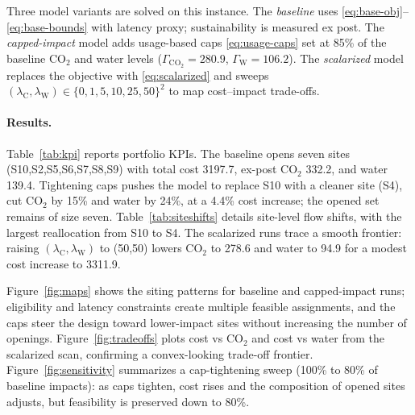 \documentclass[pdflatex,sn-mathphys-num]{sn-jnl}
\theoremstyle{thmstyleone}
\theoremstyle{thmstyletwo}
\theoremstyle{thmstylethree}
\begin{document}
\begin{table}[t]
  \centering
  \caption{Toy instance definition.}
  \label{tab:instance}
  
\end{table}

Three model variants are solved on this instance. The \emph{baseline} uses \eqref{eq:base-obj}--\eqref{eq:base-bounds} with latency proxy; sustainability is measured ex post. The \emph{capped-impact} model adds usage-based caps \eqref{eq:usage-caps} set at 85\% of the baseline CO$_2$ and water levels ($\Gamma_{\mathrm{CO_2}}=280.9$, $\Gamma_{\mathrm{W}}=106.2$). The \emph{scalarized} model replaces the objective with \eqref{eq:scalarized} and sweeps $(\lambda_{\mathrm{C}},\lambda_{\mathrm{W}})\in\{0,1,5,10,25,50\}^2$ to map cost–impact trade-offs.

\paragraph{Results.} Table~\ref{tab:kpi} reports portfolio KPIs. The baseline opens seven sites (S10,S2,S5,S6,S7,S8,S9) with total cost 3197.7, ex-post CO$_2$ 332.2, and water 139.4. Tightening caps pushes the model to replace S10 with a cleaner site (S4), cut CO$_2$ by 15\% and water by 24\%, at a 4.4\% cost increase; the opened set remains of size seven. Table~\ref{tab:siteshifts} details site-level flow shifts, with the largest reallocation from S10 to S4. The scalarized runs trace a smooth frontier: raising $(\lambda_{\mathrm{C}},\lambda_{\mathrm{W}})$ to (50,50) lowers CO$_2$ to 278.6 and water to 94.9 for a modest cost increase to 3311.9.

\begin{table}[t]
  \centering
  \caption{Baseline vs sustainability-aware KPIs.}
  \label{tab:kpi}
  
\end{table}

\begin{table}[t]
  \centering
  \caption{Site-level openings and flow shifts (baseline vs capped-impact).}
  \label{tab:siteshifts}
  
\end{table}

Figure~\ref{fig:maps} shows the siting patterns for baseline and capped-impact runs; eligibility and latency constraints create multiple feasible assignments, and the caps steer the design toward lower-impact sites without increasing the number of openings. Figure~\ref{fig:tradeoffs} plots cost vs CO$_2$ and cost vs water from the scalarized scan, confirming a convex-looking trade-off frontier. Figure~\ref{fig:sensitivity} summarizes a cap-tightening sweep (100\% to 80\% of baseline impacts): as caps tighten, cost rises and the composition of opened sites adjusts, but feasibility is preserved down to 80\%.
\end{document}
